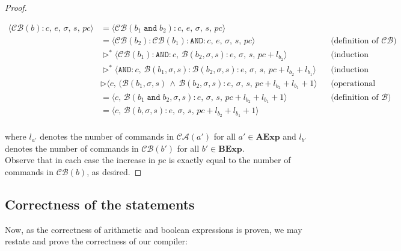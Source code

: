 \documentclass{article}
\begin{document}
\begin{proof}
\begin{itemize}
    \[
      \begin{aligned}
        \langle  \mathcal{CB}(b) : c,\, e,\, \sigma,\, s,\, pc \rangle 
        &= \langle \mathcal{CB}(b_1 \;\texttt{and}\; b_2) : c,\, e,\, \sigma,\, s,\, pc \rangle \\
        &= \langle \mathcal{CB}(b_2) : \mathcal{CB}(b_1) : \texttt{AND} : c,\, e,\, \sigma,\, s,\, pc \rangle 
        && \text{(definition of } \mathcal{CB}\text{)} \\
        &\triangleright^\ast \langle \mathcal{CB}(b_1) : \texttt{AND} : c,\, \mathcal{B}(b_2, \sigma, s) : e,\, \sigma,\, s,\, pc + l_{b_2} \rangle 
        && \text{(induction hypothesis 2)} \\
        &\triangleright^\ast \langle \texttt{AND} : c,\, \mathcal{B}(b_1, \sigma, s) : \mathcal{B}(b_2, \sigma, s) : e,\, \sigma,\, s,\, pc + l_{b_2} + l_{b_1} \rangle 
        && \text{(induction hypothesis 2)} \\
        &\triangleright \langle c,\, (\mathcal{B}(b_1, \sigma, s) \,\land\, \mathcal{B}(b_2, \sigma, s) : e,\, \sigma,\, s,\, pc + l_{b_2} + l_{b_1} + 1 \rangle
        && \text{(operational semantics)} \\
        &= \langle c,\, \mathcal{B}(b_1 \;\texttt{and}\; b_2, \sigma, s) : e,\, \sigma,\, s,\, pc + l_{b_2} + l_{b_1} + 1 \rangle 
        && \text{(definition of } \mathcal{B}\text{)} \\
        &= \langle c,\, \mathcal{B}(b, \sigma, s) : e,\, \sigma,\, s,\, pc + l_{b_2} + l_{b_1} + 1 \rangle \\
      \end{aligned}
  \]
\end{itemize}

where $l_{a'}$ denotes the number of commands in $\mathcal{CA}(a')$ for all $a' \in \textbf{AExp}$ and $l_{b'}$ denotes the number of commands in $\mathcal{CB}(b')$ for all $b' \in \textbf{BExp}$.\\
Observe that in each case the increase in $pc$ is exactly equal to the number of commands in $\mathcal{CB}(b)$, as desired.

\end{proof}

\subsection{Correctness of the statements}

Now, as the correctness of arithmetic and boolean expressions is proven, we may restate and prove the correctness of our compiler:
\end{document}
